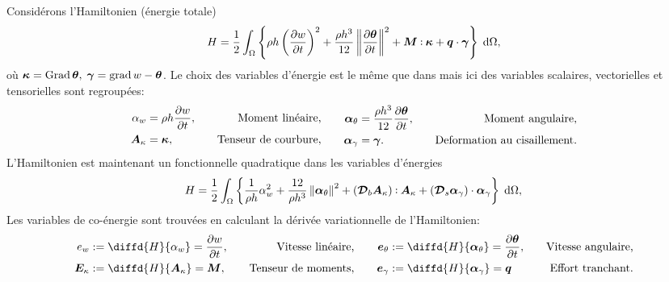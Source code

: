 Considérons l'Hamiltonien (énergie totale)
\begin{equation*}
H = \frac{1}{2} \int_{\Omega}  \left\{ \rho h \left(\diffp{w}{t} \right)^2 + \frac{\rho h^3}{12} \norm{\diffp{\bm{\theta}}{t}}^2 +   \bm{M} \cddot \bm{\kappa} + \bm{q} \cdot \bm{\gamma}  \right\}  \d\Omega, 
\end{equation*}
où $\bm{\kappa} = \operatorname*{Grad} \bm{\theta}, \; \bm{\gamma} = \operatorname*{grad} w - \bm{\theta}$. Le choix des variables d'énergie est le même que dans \cite{macchelli2005mindlin} mais ici des variables scalaires, vectorielles et tensorielles sont regroupées:
\begin{equation*}
\begin{aligned}
\alpha_w &= \rho h \diffp{w}{t}, \quad &\text{Moment linéaire,} \\
\bm{A}_{\kappa} &= \bm{\kappa}, \quad &\text{Tenseur de courbure,} \\
\end{aligned} \qquad
\begin{aligned}
\bm\alpha_{\theta} &=  \frac{\rho h^3}{12} \diffp{\bm{\theta}}{t}, \quad &\text{Moment angulaire,}\\
\bm\alpha_{\gamma} &= \bm{\gamma}. \quad &\text{Deformation au cisaillement.}\\
\end{aligned}
\end{equation*}
L'Hamiltonien est maintenant un fonctionnelle quadratique dans les variables d'énergies
\begin{equation*}
H = \frac{1}{2} \int_{\Omega}  \left\{ \frac{1}{\rho h}\alpha_w^2 + \frac{12}{\rho h^3} \norm{\bm{\alpha}_{\theta}}^2 + (\bm{\mathcal{D}}_b \bm{A}_\kappa) \cddot \bm{A}_\kappa + (\bm{\mathcal{D}}_s \bm{\alpha}_\gamma) \cdot  \bm{\alpha}_\gamma  \right\}  \d\Omega, 
\end{equation*}
Les variables de co-énergie sont trouvées en calculant la dérivée variationnelle de l'Hamiltonien:
\begin{equation*}
\begin{aligned}
e_w &:= \diffd{H}{\alpha_w} = \diffp{w}{t},  \quad &\text{Vitesse linéaire,} \\
\bm{E}_{\kappa} &:= \diffd{H}{\bm{A}_{\kappa}} = \bm{M}, \quad &\text{Tenseur de moments,}\\
\end{aligned} \qquad
\begin{aligned}
\bm{e}_{\theta} &:= \diffd{H}{\bm\alpha_{\theta}} = \diffp{\bm{\theta}}{t}, \quad &\text{Vitesse angulaire,}  \\
\bm{e}_{\gamma} &:= \diffd{H}{\bm\alpha_{\gamma}} = \bm{q} \quad &\text{Effort tranchant.} \\
\end{aligned}
\end{equation*}
